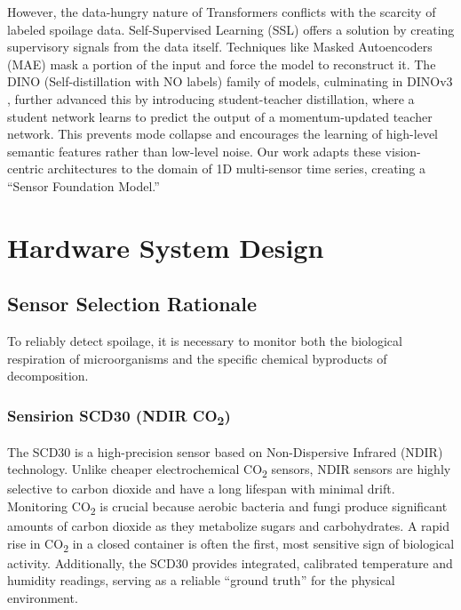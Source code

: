 \documentclass[conference]{IEEEtran}
\begin{document}
    However, the data-hungry nature of Transformers conflicts with the scarcity of labeled spoilage data. Self-Supervised Learning (SSL) offers a solution by creating supervisory signals from the data itself. Techniques like Masked Autoencoders (MAE) \cite{mae} mask a portion of the input and force the model to reconstruct it. The DINO (Self-distillation with NO labels) family of models, culminating in DINOv3 \cite{dinov3}, further advanced this by introducing student-teacher distillation, where a student network learns to predict the output of a momentum-updated teacher network. This prevents mode collapse and encourages the learning of high-level semantic features rather than low-level noise. Our work adapts these vision-centric architectures to the domain of 1D multi-sensor time series, creating a ``Sensor Foundation Model.''

    \section{Hardware System Design}

    \subsection{Sensor Selection Rationale}
    To reliably detect spoilage, it is necessary to monitor both the biological respiration of microorganisms and the specific chemical byproducts of decomposition.

    \subsubsection{Sensirion SCD30 (NDIR \texorpdfstring{CO\textsubscript{2}}{CO2})}
    The SCD30 \cite{scd30} is a high-precision sensor based on Non-Dispersive Infrared (NDIR) technology. Unlike cheaper electrochemical CO\textsubscript{2} sensors, NDIR sensors are highly selective to carbon dioxide and have a long lifespan with minimal drift. Monitoring CO\textsubscript{2} is crucial because aerobic bacteria and fungi produce significant amounts of carbon dioxide as they metabolize sugars and carbohydrates. A rapid rise in CO\textsubscript{2} in a closed container is often the first, most sensitive sign of biological activity. Additionally, the SCD30 provides integrated, calibrated temperature and humidity readings, serving as a reliable ``ground truth'' for the physical environment.
\end{document}
